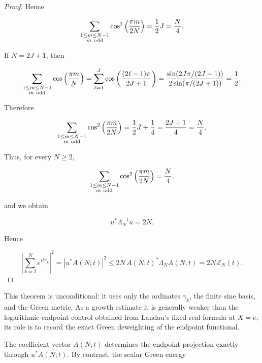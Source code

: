 \documentclass[11pt]{amsart}
\numberwithin{equation}{section}
\theoremstyle{plain}
\theoremstyle{definition}
\theoremstyle{remark}
\begin{document}
\begin{proof}
Hence

\begin{equation}
\sum_{\substack{1\le m\le N-1\\m\ {\rm odd}}}
\cos^2\left(\frac{\pi m}{2N}\right)
=
\frac12 J
=
\frac N4.
\end{equation}

If \(N=2J+1\), then

\begin{equation}
\sum_{\substack{1\le m\le N-1\\m\ {\rm odd}}}
\cos\left(\frac{\pi m}{N}\right)
=
\sum_{\ell=1}^{J}
\cos\left(\frac{(2\ell-1)\pi}{2J+1}\right)
=
\frac{\sin(2J\pi/(2J+1))}{2\sin(\pi/(2J+1))}
=
\frac12.
\end{equation}

Therefore

\begin{equation}
\sum_{\substack{1\le m\le N-1\\m\ {\rm odd}}}
\cos^2\left(\frac{\pi m}{2N}\right)
=
\frac12 J+\frac14
=
\frac{2J+1}{4}
=
\frac N4.
\end{equation}

Thus, for every \(N\ge2\),

\begin{equation}
\sum_{\substack{1\le m\le N-1\\m\ {\rm odd}}}
\cos^2\left(\frac{\pi m}{2N}\right)
=
\frac N4,
\end{equation}

and we obtain

\begin{equation}
u^*\Lambda_N^{-1}u=2N.
\end{equation}

Hence

\begin{equation}
\left|
\sum_{k=2}^{N}e^{it\gamma_k}
\right|^2
=
|u^*A(N;t)|^2
\le
2N\,A(N;t)^*\Lambda_NA(N;t)
=
2N\,\mathcal E_N(t).
\end{equation}
\end{proof}

This theorem is unconditional: it uses only the ordinates \(\gamma_k\),
the finite sine basis, and the Green metric.
As a growth estimate it is generally weaker than the logarithmic endpoint
control obtained from Landau's fixed-real formula at \(X=e\); its role is
to record the exact Green deweighting of the endpoint functional.

The coefficient vector \(A(N;t)\) determines the endpoint projection
exactly through \(u^*A(N;t)\). By contrast, the scalar Green energy
\end{document}
